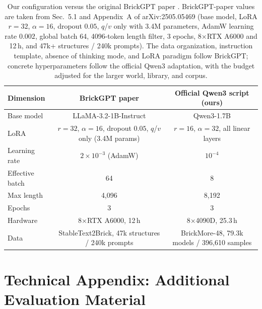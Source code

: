 \begin{table}[!htbp]
\centering
\small
\setlength{\tabcolsep}{5pt}
\begin{tabular}{lcc}
\toprule
Dimension & BrickGPT paper & Official Qwen3 script (ours) \\
\midrule
Base model & LLaMA-3.2-1B-Instruct & Qwen3-1.7B \\
LoRA & $r=32$, $\alpha=16$, dropout $0.05$, $q$/$v$ only (3.4M params) & $r=16$, $\alpha=32$, all linear layers \\
Learning rate & $2{\times}10^{-3}$ (AdamW) & $10^{-4}$ \\
Effective batch & 64 & 8 \\
Max length & 4,096 & 8,192 \\
Epochs & 3 & 3 \\
Hardware & 8$\times$RTX A6000, 12\,h & 8$\times$4090D, 25.3\,h \\
Data & StableText2Brick, 47k structures / 240k prompts & BrickMore-48, 79.3k models / 396,610 samples \\
\bottomrule
\end{tabular}
\caption{Our configuration versus the original BrickGPT paper \cite{brickgpt}. BrickGPT-paper values are taken from Sec.~5.1 and Appendix~A of arXiv:2505.05469 (base model, LoRA $r{=}32$, $\alpha{=}16$, dropout $0.05$, $q$/$v$ only with 3.4M parameters, AdamW learning rate $0.002$, global batch 64, 4096-token length filter, 3 epochs, 8$\times$RTX A6000 and 12\,h, and 47k+ structures / 240k prompts). The data organization, instruction template, absence of thinking mode, and LoRA paradigm follow BrickGPT; concrete hyperparameters follow the official Qwen3 adaptation, with the budget adjusted for the larger world, library, and corpus.}
\label{tab:brickgpt-recipe}
\end{table}


\section{Technical Appendix: Additional Evaluation Material}
\label{app:eval}



